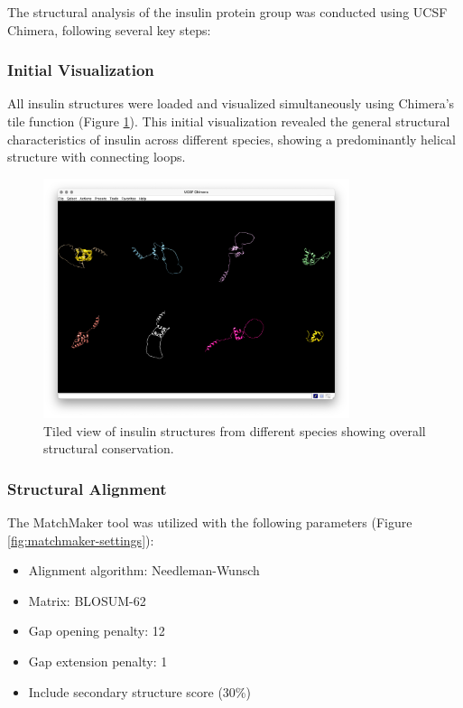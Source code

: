 \documentclass[11pt, a4paper, hidelinks]{article}
\begin{document}
The structural analysis of the insulin protein group was conducted using UCSF Chimera, following several key steps:

\subsubsection{Initial Visualization}\label{subsubsec:visualization}
All insulin structures were loaded and visualized simultaneously using Chimera's tile function (Figure \ref{fig:insulin-tile}). This initial visualization revealed the general structural characteristics of insulin across different species, showing a predominantly helical structure with connecting loops.

\begin{figure}[H]
    \centering
    \includegraphics[width=0.8\textwidth]{AAA59172.1/_img/tile}
    \caption{Tiled view of insulin structures from different species showing overall structural conservation.}
    \label{fig:insulin-tile}
\end{figure}

\subsubsection{Structural Alignment}\label{subsubsec:alignment}
The MatchMaker tool was utilized with the following parameters (Figure \ref{fig:matchmaker-settings}):
\begin{itemize}
    \item Alignment algorithm: Needleman-Wunsch
    \item Matrix: BLOSUM-62
    \item Gap opening penalty: 12
    \item Gap extension penalty: 1
    \item Include secondary structure score (30\%)
\end{itemize}
\end{document}
